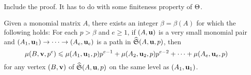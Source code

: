 \documentclass[11pt]{amsart}
\begin{document}
\alert[inline]{Include the proof.  It has to do with some finiteness property of $\Theta$.}




\begin{lemma}\label{lem: upper bound for higher mu}
   Given a monomial matrix $A$, there exists an integer $\beta= \beta(A)$ for which the following holds\textup:
   For each $p>\beta$ and $e\ge 1$, if $(A, \mathbf{u})$ is a very small monomial pair and $(A_1, \mathbf{u}_1) \to \cdots \to (A_e, \mathbf{u}_e)$ is a path in $\widehat{\mathfrak{S}}(A, \mathbf{u}, p)$,  then
   \[
      \mu(B, \mathbf{v}, p^e) \leqslant \mu(A_1, \mathbf{u}_1, p)p^{e-1} + \mu(A_2, \mathbf{u}_2, p)p^{e-2} + \cdots + \mu(A_{e}, \mathbf{u}_{e}, p)
   \]
   for any vertex $(B, \mathbf{v})$ of $\widehat{\mathfrak{S}}(A, \mathbf{u}, p)$ on the same level as $(A_1, \mathbf{u}_1)$.
\end{lemma}
\end{document}
